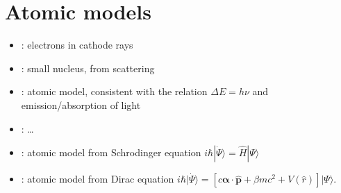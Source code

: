 \documentclass[letterpaper,10pt,english]{jupyterBook}
\begin{document}
\chapter{Atomic models}
\label{\detokenize{ch/quantum-mechanics/atom-models:atomic-models}}\label{\detokenize{ch/quantum-mechanics/atom-models:quantum-mechanics-atom-models}}\label{\detokenize{ch/quantum-mechanics/atom-models::doc}}\begin{itemize}
\item {} 
\sphinxAtStartPar
{\hyperref[\detokenize{ch/quantum-mechanics/atom-models/thomson:quantum-mechanics-atom-models-thomson}]{}}: electrons in cathode rays

\item {} 
\sphinxAtStartPar
{\hyperref[\detokenize{ch/quantum-mechanics/atom-models/rutherford:quantum-mechanics-atom-models-rutherford}]{}}: small nucleus, from scattering

\item {} 
\sphinxAtStartPar
{\hyperref[\detokenize{ch/quantum-mechanics/atom-models/bohr:quantum-mechanics-atom-models-bohr}]{}}: atomic model, consistent with the relation \(\Delta E = h \nu\) and emission/absorption of light

\item {} 
\sphinxAtStartPar
{\hyperref[\detokenize{ch/quantum-mechanics/atom-models/sommerfeld:quantum-mechanics-atom-models-sommerfeld}]{}}: …

\item {} 
\sphinxAtStartPar
{\hyperref[\detokenize{ch/quantum-mechanics/atom-models/schrodinger:quantum-mechanics-atom-models-schrodinger}]{}}: atomic model from Schrodinger equation \(i \hbar | \dot{\Psi} \rangle = \hat{H} | \Psi \rangle\)

\item {} 
\sphinxAtStartPar
{\hyperref[\detokenize{ch/quantum-mechanics/atom-models/dirac:quantum-mechanics-atom-models-dirac}]{}}: atomic model from Dirac equation \(i \hbar \dot{| \Psi \rangle} = \left[ c \boldsymbol\alpha \cdot \hat{\mathbf{p}} + \beta m c^2 + V(\hat{r}) \right] | \Psi \rangle\).

\end{itemize}

\sphinxstepscope
\end{document}
